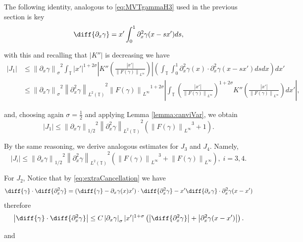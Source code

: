 \documentclass[a4paper]{amsart}
\theoremstyle{definition}
\newcommand{\T}{\ensuremath{\mathbb{T}}}
\newcommand{\Na}[2][\gamma]{\ensuremath{\left\|#2\right\|_{#1}}}
\newcommand{\SNa}[2][\gamma]{\ensuremath{\left|#2\right|_{#1}}}
\newcommand{\Np}[2][\infty]{\ensuremath{\left\|#2\right\|_{L^#1}}}
\newcommand{\Lp}[2][2]{\ensuremath{\left\|#2\right\|_{L^#1(\T)}}}
\newcommand{\intT}{\ensuremath{\int_\T}}
\begin{document}
        The following identity, analogous to \eqref{eq:MVTgammaH3} used in the previous section is key 
        \begin{equation}\label{eq:MVTgammaH2}
            \diff{\partial_x\gamma}=x' \int_0^1 \partial_x^2\gamma(x-sx') ds,
        \end{equation}

        with this and recalling that $|K''|$  is decreasing we have 
        \begin{align*}
            |J_1|&\leq \Na[\sigma]{\partial_x\gamma}^2\intT |x'|^{1+2\sigma} \left|K''\left(\frac{|x'|}{\Np{F(\gamma)}}\right)\right| \left(\intT\int_0^1 \partial_x^2\gamma(x) \cdot \partial_x^2\gamma(x-sx')ds dx\right) dx'\\
            &\leq \Na[\sigma]{\partial_x\gamma}^2 \Lp{\partial_x^2 \gamma}^2 \Np{F(\gamma)}^{1+2\sigma} \left|\intT \left(\frac{|x'|}{\Np{F(\gamma)}}\right)^{1+2\sigma} K''\left(\frac{|x'|}{\Np{F(\gamma)}}\right) dx'\right|,
        \end{align*}

       and, choosing again $\sigma=\frac{1}{2}$ and applying Lemma \ref{lemma:canviVar}, we obtain 
        $$|J_1|\leq \Na[1/2]{\partial_x\gamma}^2 \Lp{\partial_x^2 \gamma}^2 (\Np{F(\gamma)}^{3}+1).$$

        By the same reasoning, we derive analogous estimates for $J_3$ and $J_4$. Namely, $$|J_i|\leq \Na[1/2]{\partial_x\gamma}^2 \Lp{\partial_x^2 \gamma}^2 (\Np{F(\gamma)}^{3}+\Np{F(\gamma)}), \; i=3,4.$$
        
        For $J_2$, Notice that by \eqref{eq:extraCancellation} we have 
        $$\diff{\gamma}\cdot \diff{\partial_x^2 \gamma}=(\diff{\gamma}-\partial_x\gamma(x)x')\cdot \diff{\partial_x^2\gamma}-x'\diff{\partial_x\gamma}\cdot \partial_x^2\gamma (x-x')$$
        therefore
        $$\left|\diff{\gamma}\cdot\diff{\partial_x^2\gamma}\right|\leq C\SNa[\sigma]{\partial_x\gamma}|x'|^{1+\sigma}
\left(\left|\diff{\partial_x^2\gamma}\right|+\left|\partial_x^2\gamma(x-x')\right|\right).$$

        and
\end{document}
